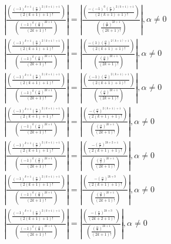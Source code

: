 \documentclass[a4paper,12pt]{report}
\begin{document}
\begin{landscape}
{\begin{gather}
\left|\frac{\left(\frac{(-1)^{k+1} \left(\frac{\alpha}{r}\right)^{2(k+1)+1}}{(2(k+1)+1)!}\right)}{\left(\frac{(-1)^k \left(\frac{\alpha}{r}\right)^{2k+1}}{(2k+1)!}\right)}\right| = \left|\frac{\left(\frac{-(-1)^{0}\left(\frac{\alpha}{r}\right)^{2(k+1)+1}}{(2(k+1)+1)!}\right)}{\left(\frac{\left(\frac{\alpha}{r}\right)^{2k+1}}{(2k+1)!}\right)}\right|, \alpha \neq 0 \\
\left|\frac{\left(\frac{(-1)^{k+1} \left(\frac{\alpha}{r}\right)^{2(k+1)+1}}{(2(k+1)+1)!}\right)}{\left(\frac{(-1)^k \left(\frac{\alpha}{r}\right)^{2k+1}}{(2k+1)!}\right)}\right| = \left|\frac{\left(\frac{-(1) \left(\frac{\alpha}{r}\right)^{2(k+1)+1}}{(2(k+1)+1)!}\right)}{\left(\frac{\left(\frac{\alpha}{r}\right)^{2k+1}}{(2k+1)!}\right)}\right|, \alpha \neq 0 \\
\left|\frac{\left(\frac{(-1)^{k+1} \left(\frac{\alpha}{r}\right)^{2(k+1)+1}}{(2(k+1)+1)!}\right)}{\left(\frac{(-1)^k \left(\frac{\alpha}{r}\right)^{2k+1}}{(2k+1)!}\right)}\right| = \left|\frac{\left(\frac{(-1) \left(\frac{\alpha}{r}\right)^{2(k+1)+1}}{(2(k+1)+1)!}\right)}{\left(\frac{\left(\frac{\alpha}{r}\right)^{2k+1}}{(2k+1)!}\right)}\right|, \alpha \neq 0 \\
\left|\frac{\left(\frac{(-1)^{k+1} \left(\frac{\alpha}{r}\right)^{2(k+1)+1}}{(2(k+1)+1)!}\right)}{\left(\frac{(-1)^k \left(\frac{\alpha}{r}\right)^{2k+1}}{(2k+1)!}\right)}\right| = \left|\frac{\left(\frac{-\left(\frac{\alpha}{r}\right)^{2(k+1)+1}}{(2(k+1)+1)!}\right)}{\left(\frac{\left(\frac{\alpha}{r}\right)^{2k+1}}{(2k+1)!}\right)}\right|, \alpha \neq 0 \\
\left|\frac{\left(\frac{(-1)^{k+1} \left(\frac{\alpha}{r}\right)^{2(k+1)+1}}{(2(k+1)+1)!}\right)}{\left(\frac{(-1)^k \left(\frac{\alpha}{r}\right)^{2k+1}}{(2k+1)!}\right)}\right| = \left|\frac{\left(\frac{-\left(\frac{\alpha}{r}\right)^{2k+2+1}}{(2(k+1)+1)!}\right)}{\left(\frac{\left(\frac{\alpha}{r}\right)^{2k+1}}{(2k+1)!}\right)}\right|, \alpha \neq 0 \\
\left|\frac{\left(\frac{(-1)^{k+1} \left(\frac{\alpha}{r}\right)^{2(k+1)+1}}{(2(k+1)+1)!}\right)}{\left(\frac{(-1)^k \left(\frac{\alpha}{r}\right)^{2k+1}}{(2k+1)!}\right)}\right| = \left|\frac{\left(\frac{-\left(\frac{\alpha}{r}\right)^{2k+3}}{(2(k+1)+1)!}\right)}{\left(\frac{\left(\frac{\alpha}{r}\right)^{2k+1}}{(2k+1)!}\right)}\right|, \alpha \neq 0 \\
\left|\frac{\left(\frac{(-1)^{k+1} \left(\frac{\alpha}{r}\right)^{2(k+1)+1}}{(2(k+1)+1)!}\right)}{\left(\frac{(-1)^k \left(\frac{\alpha}{r}\right)^{2k+1}}{(2k+1)!}\right)}\right| = \left|\frac{\left(\frac{-\left(\frac{\alpha}{r}\right)^{2k+3}}{(2k+2+1)!}\right)}{\left(\frac{\left(\frac{\alpha}{r}\right)^{2k+1}}{(2k+1)!}\right)}\right|, \alpha \neq 0 \\

\end{gather}}
\end{landscape}
\end{document}
